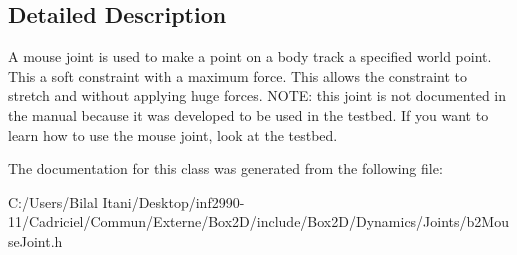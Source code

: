 \subsection{Detailed Description}
A mouse joint is used to make a point on a body track a specified world point. This a soft constraint with a maximum force. This allows the constraint to stretch and without applying huge forces. N\+O\+TE\+: this joint is not documented in the manual because it was developed to be used in the testbed. If you want to learn how to use the mouse joint, look at the testbed. 

The documentation for this class was generated from the following file\+:\begin{DoxyCompactItemize}
\item 
C\+:/\+Users/\+Bilal Itani/\+Desktop/inf2990-\/11/\+Cadriciel/\+Commun/\+Externe/\+Box2\+D/include/\+Box2\+D/\+Dynamics/\+Joints/b2\+Mouse\+Joint.\+h\end{DoxyCompactItemize}
